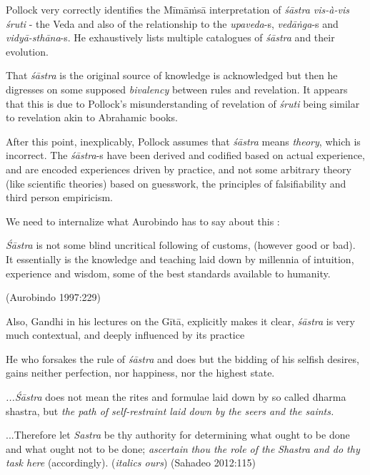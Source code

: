 Pollock very correctly identifies the Mīmāṁsā interpretation of {\sl śāstra vis-à-vis śruti} - the Veda and also of the relationship to the {\sl upaveda}-s, {\sl vedāṅga}-s and  {\sl vidyā-sthāna}-s. He exhaustively lists multiple catalogues of {\sl śāstra} and their evolution.

That {\sl śāstra} is the original source of knowledge is acknowledged but then he digresses on some supposed {\sl bivalency} between rules and revelation. It appears that this is due to Pollock's misunderstanding of revelation of {\sl śruti} being similar to revelation akin to Abrahamic books.

After this point, inexplicably, Pollock assumes that {\sl śāstra} means {\sl theory}, which is incorrect. The {\sl śāstra}-s have been derived and codified based on actual experience, and are encoded experiences driven by practice, and not some arbitrary theory (like scientific theories) based on guesswork, the principles of falsifiability and third person empiricism.

We need to internalize what Aurobindo has to say about this :
\begin{myquote}
{{\sl Śāstra}} is not some blind uncritical following of customs, (however good or bad). It essentially is the knowledge and teaching laid down by millennia of intuition, experience and wisdom, some of the best standards available to humanity.

\hfill (Aurobindo 1997:229)
\end{myquote}

Also, Gandhi in his lectures on the Gītā, explicitly makes it clear, {\sl śāstra} is very much contextual, and deeply influenced by its practice
\begin{myquote}
He who forsakes the rule of {\sl śāstra} and does but the bidding of his selfish desires, gains neither perfection, nor happiness, nor the highest state.

{\sl ...Śāstra} does not mean the rites and formulae laid down by so called dharma shastra, but {\sl the path of self-restraint laid down by the seers and the saints.}

...Therefore let {\sl Sastra} be thy authority for determining what ought to be done and what ought not to be done; {{\sl ascertain}\relax} {\sl thou the role of the} {{\sl Shastra}\relax} {\sl and do thy task here} (accordingly).
\hfill ({\sl italics ours}) (Sahadeo 2012:115)
\end{myquote}

